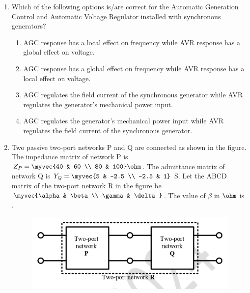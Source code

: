 \documentclass[journal,12pt,onecolumn]{IEEEtran}
\theoremstyle{remark}
\begin{document}
\begin{enumerate}[start=1, label=Q.\arabic*]
    \hfill{}

    \item Which of the following options is/are correct for the Automatic Generation Control  and Automatic Voltage Regulator  installed with synchronous generators?
    \begin{enumerate}
        \item AGC response has a local effect on frequency while AVR response has a global effect on voltage.
        \item AGC response has a global effect on frequency while AVR response has a local effect on voltage.
        \item AGC regulates the field current of the synchronous generator while AVR regulates the generator's mechanical power input.
        \item AGC regulates the generator's mechanical power input while AVR regulates the field current of the synchronous generator.
    \end{enumerate}

    \hfill{}

    \item Two passive two-port networks P and Q are connected as shown in the figure. The impedance matrix of network P is $Z_P = \myvec{40 & 60 \\ 80 & 100} \ohm$. The admittance matrix of network Q is $Y_Q = \myvec{5 & -2.5 \\ -2.5 & 1}$ S. Let the ABCD matrix of the two-port network R in the figure be $\myvec{\alpha & \beta \\ \gamma & \delta}$. The value of $\beta$ in $\ohm$ is \underline{\hspace{2cm}} .
    \begin{figure}[H]
        \includegraphics[width=0.7\columnwidth]{Figures/q48.png}
        \centering
        \caption{}
    \end{figure}

    \hfill{}


\end{enumerate}
\end{document}
